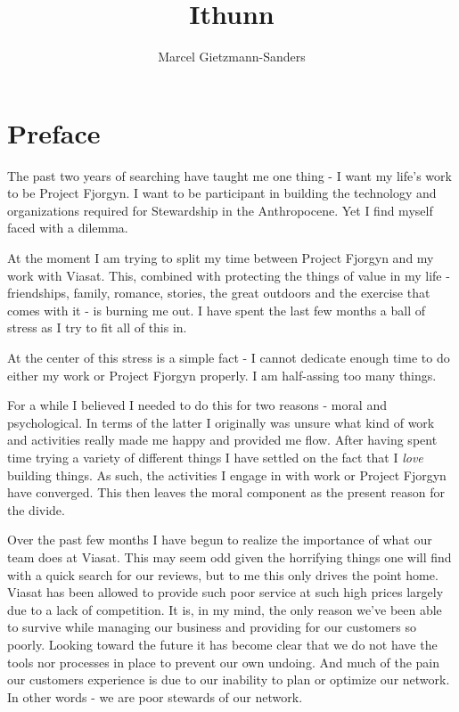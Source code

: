 \documentclass[10pt,a5paper]{book}
\title{Ithunn}
\author{Marcel Gietzmann-Sanders}
\begin{document}
\maketitle
\tableofcontents
\newpage
\chapter*{Preface}
The past two years of searching have taught me one thing - I want my life's work to be Project Fjorgyn. I want to be participant in building the technology and organizations required for Stewardship in the Anthropocene. Yet I find myself faced with a dilemma. 

At the moment I am trying to split my time between Project Fjorgyn and my work with Viasat. This, combined with protecting the things of value in my life - friendships, family, romance, stories, the great outdoors and the exercise that comes with it - is burning me out. I have spent the last few months a ball of stress as I try to fit all of this in. 

At the center of this stress is a simple fact - I cannot dedicate enough time to do either my work or Project Fjorgyn properly. I am half-assing too many things. 

For a while I believed I needed to do this for two reasons - moral and psychological. In terms of the latter I originally was unsure what kind of work and activities really made me happy and provided me flow. After having spent time trying a variety of different things I have settled on the fact that I \textit{love} building things. As such, the activities I engage in with work or Project Fjorgyn have converged. This then leaves the moral component as the present reason for the divide. 

Over the past few months I have begun to realize the importance of what our team does at Viasat. This may seem odd given the horrifying things one will find with a quick search for our reviews, but to me this only drives the point home. Viasat has been allowed to provide such poor service at such high prices largely due to a lack of competition. It is, in my mind, the only reason we've been able to survive while managing our business and providing for our customers so poorly. Looking toward the future it has become clear that we do not have the tools nor processes in place to prevent our own undoing. And much of the pain our customers experience is due to our inability to plan or optimize our network. In other words - we are poor stewards of our network. 
\end{document}
